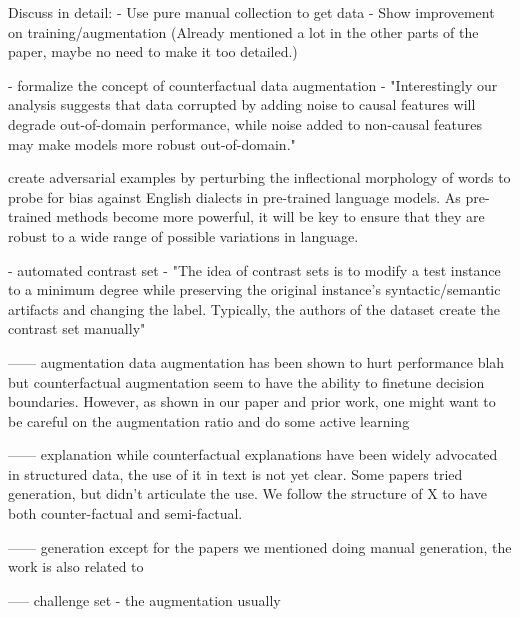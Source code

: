 Discuss in detail:
\citet{gardner2020contrast}
\citet{kaushik2019learning}
- Use pure manual collection to get data
- Show improvement on training/augmentation
(Already mentioned a lot in the other parts of the paper, maybe no need to make it too detailed.)

\citet{kaushik2020explaining}
- formalize the concept of counterfactual data augmentation
- "Interestingly our analysis suggests that data corrupted by adding noise to causal features will degrade out-of-domain performance, while noise added to non-causal features may make models more robust out-of-domain."

\citet{tan2020s}
create adversarial examples by perturbing the inflectional morphology of words to probe for bias against English dialects in pre-trained language models. As pre-trained methods become more powerful, it will be key to ensure that they are robust to a wide range of possible variations in language.

\citet{li2020linguistically}
- automated contrast set 
- "The idea of contrast sets is to modify a test instance to a minimum degree while preserving the original instance’s syntactic/semantic artifacts and changing the label. Typically, the authors of the dataset create the contrast set manually"

------ augmentation
data augmentation has been shown to hurt performance blah
but counterfactual augmentation seem to have the ability to finetune decision boundaries. However, as shown in our paper and prior work, one might want to be careful on the augmentation ratio and do some active learning

------ explanation
while counterfactual explanations have been widely advocated in structured data, the use of it in text is not yet clear. 
Some papers tried generation, but didn't articulate the use.
We follow the structure of X to have both counter-factual and semi-factual. 

------ generation
except for the papers we mentioned doing manual generation, the work is also related to 


----- challenge set
- the augmentation usually 


